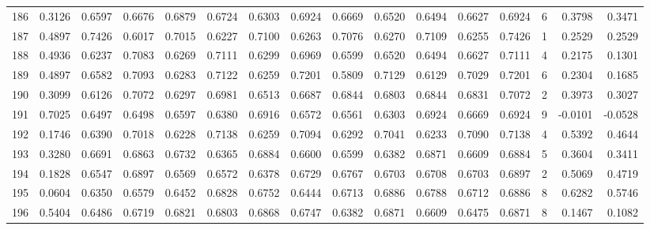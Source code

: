 \begin{tabular}{lrrrrrrrrrrrrrrr}
186 &      0.3126 &  0.6597 &  0.6676 &  0.6879 &  0.6724 &  0.6303 &  0.6924 &  0.6669 &  0.6520 &  0.6494 &   0.6627 &     0.6924 &      6 &                    0.3798 &                     0.3471 \\
187 &      0.4897 &  0.7426 &  0.6017 &  0.7015 &  0.6227 &  0.7100 &  0.6263 &  0.7076 &  0.6270 &  0.7109 &   0.6255 &     0.7426 &      1 &                    0.2529 &                     0.2529 \\
188 &      0.4936 &  0.6237 &  0.7083 &  0.6269 &  0.7111 &  0.6299 &  0.6969 &  0.6599 &  0.6520 &  0.6494 &   0.6627 &     0.7111 &      4 &                    0.2175 &                     0.1301 \\
189 &      0.4897 &  0.6582 &  0.7093 &  0.6283 &  0.7122 &  0.6259 &  0.7201 &  0.5809 &  0.7129 &  0.6129 &   0.7029 &     0.7201 &      6 &                    0.2304 &                     0.1685 \\
190 &      0.3099 &  0.6126 &  0.7072 &  0.6297 &  0.6981 &  0.6513 &  0.6687 &  0.6844 &  0.6803 &  0.6844 &   0.6831 &     0.7072 &      2 &                    0.3973 &                     0.3027 \\
191 &      0.7025 &  0.6497 &  0.6498 &  0.6597 &  0.6380 &  0.6916 &  0.6572 &  0.6561 &  0.6303 &  0.6924 &   0.6669 &     0.6924 &      9 &                   -0.0101 &                    -0.0528 \\
192 &      0.1746 &  0.6390 &  0.7018 &  0.6228 &  0.7138 &  0.6259 &  0.7094 &  0.6292 &  0.7041 &  0.6233 &   0.7090 &     0.7138 &      4 &                    0.5392 &                     0.4644 \\
193 &      0.3280 &  0.6691 &  0.6863 &  0.6732 &  0.6365 &  0.6884 &  0.6600 &  0.6599 &  0.6382 &  0.6871 &   0.6609 &     0.6884 &      5 &                    0.3604 &                     0.3411 \\
194 &      0.1828 &  0.6547 &  0.6897 &  0.6569 &  0.6572 &  0.6378 &  0.6729 &  0.6767 &  0.6703 &  0.6708 &   0.6703 &     0.6897 &      2 &                    0.5069 &                     0.4719 \\
195 &      0.0604 &  0.6350 &  0.6579 &  0.6452 &  0.6828 &  0.6752 &  0.6444 &  0.6713 &  0.6886 &  0.6788 &   0.6712 &     0.6886 &      8 &                    0.6282 &                     0.5746 \\
196 &      0.5404 &  0.6486 &  0.6719 &  0.6821 &  0.6803 &  0.6868 &  0.6747 &  0.6382 &  0.6871 &  0.6609 &   0.6475 &     0.6871 &      8 &                    0.1467 &                     0.1082 \\

\end{tabular}
